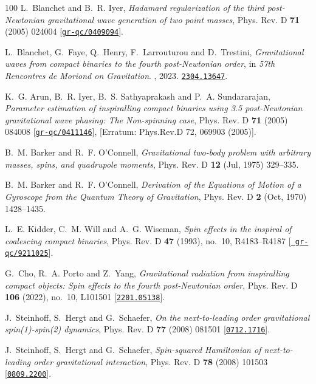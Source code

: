 \begin{thebibliography}{100}
L.~Blanchet and B.~R. Iyer,  {\em {Hadamard regularization of the third
  post-Newtonian gravitational wave generation of two point masses}}, Phys.
  Rev. D {\bf 71} (2005) 024004
  [\href{http://www.arXiv.org/abs/gr-qc/0409094}{{\tt gr-qc/0409094}}].

L.~Blanchet, G.~Faye, Q.~Henry, F.~Larrouturou and D.~Trestini,  {\em
  {Gravitational waves from compact binaries to the fourth post-Newtonian
  order}}, in {\em {57th Rencontres de Moriond on Gravitation}}.
, 2023.
\newblock \href{http://www.arXiv.org/abs/2304.13647}{{\tt 2304.13647}}.

K.~G. Arun, B.~R. Iyer, B.~S. Sathyaprakash and P.~A. Sundararajan,  {\em
  {Parameter estimation of inspiralling compact binaries using 3.5
  post-Newtonian gravitational wave phasing: The Non-spinning case}}, Phys.
  Rev. D {\bf 71} (2005) 084008
  [\href{http://www.arXiv.org/abs/gr-qc/0411146}{{\tt gr-qc/0411146}}],
  [Erratum: Phys.Rev.D 72, 069903 (2005)].

B.~M. Barker and R.~F. O'Connell,  {\em Gravitational two-body problem with
  arbitrary masses, spins, and quadrupole moments}, Phys. Rev. D {\bf 12} (Jul,
  1975) 329--335.

B.~M. Barker and R.~F. O'Connell,  {\em Derivation of the Equations of Motion
  of a Gyroscope from the Quantum Theory of Gravitation}, Phys. Rev. D {\bf 2}
  (Oct, 1970) 1428--1435.

L.~E. Kidder, C.~M. Will and A.~G. Wiseman,  {\em {Spin effects in the inspiral
  of coalescing compact binaries}}, Phys. Rev. D {\bf 47} (1993), no.~10,
  R4183--R4187 [\href{http://www.arXiv.org/abs/gr-qc/9211025}{{\tt
  gr-qc/9211025}}].

G.~Cho, R.~A. Porto and Z.~Yang,  {\em {Gravitational radiation from
  inspiralling compact objects: Spin effects to the fourth post-Newtonian
  order}}, Phys. Rev. D {\bf 106} (2022), no.~10, L101501
  [\href{http://www.arXiv.org/abs/2201.05138}{{\tt 2201.05138}}].

J.~Steinhoff, S.~Hergt and G.~Schaefer,  {\em {On the next-to-leading order
  gravitational spin(1)-spin(2) dynamics}}, Phys. Rev. D {\bf 77} (2008) 081501
  [\href{http://www.arXiv.org/abs/0712.1716}{{\tt 0712.1716}}].

J.~Steinhoff, S.~Hergt and G.~Schaefer,  {\em {Spin-squared Hamiltonian of
  next-to-leading order gravitational interaction}}, Phys. Rev. D {\bf 78}
  (2008) 101503 [\href{http://www.arXiv.org/abs/0809.2200}{{\tt 0809.2200}}].


\end{thebibliography}
